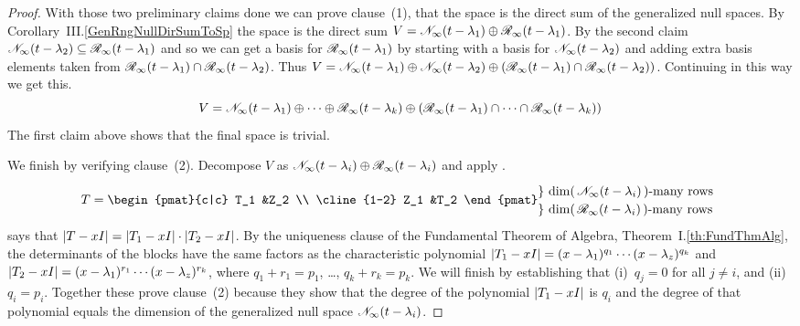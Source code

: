 \begin{proof}
With those two preliminary claims done 
we can prove clause~(1), that the space is the direct sum of the
generalized null spaces.
By Corollary~III.\ref{GenRngNullDirSumToSp} the space is the direct sum
\( V=\mathscr{N}_\infty(t-\lambda_1)\oplus\mathscr{R}_\infty(t-\lambda_1) \).
By the second claim
\( \mathscr{N}_\infty(t-\lambda_2)\subseteq\mathscr{R}_\infty(t-\lambda_1) \)
and so we can get a basis for \( \mathscr{R}_\infty(t-\lambda_1) \) by
starting with a basis for \( \mathscr{N}_\infty(t-\lambda_2) \) and adding
extra basis elements taken from
\( \mathscr{R}_\infty(t-\lambda_1)\cap\mathscr{R}_\infty(t-\lambda_2) \). 
Thus \( V=\mathscr{N}_\infty(t-\lambda_1)\oplus\mathscr{N}_\infty(t-\lambda_2)
          \oplus 
       (\mathscr{R}_\infty(t-\lambda_1)\cap\mathscr{R}_\infty(t-\lambda_2)) \).
Continuing in this way we get this.
\begin{equation*}
  V=\mathscr{N}_\infty(t-\lambda_1)\oplus\cdots\oplus\mathscr{R}_\infty(t-\lambda_k)
          \oplus 
       (\mathscr{R}_\infty(t-\lambda_1)\cap\cdots\cap\mathscr{R}_\infty(t-\lambda_k))
\end{equation*}
The first claim above shows that the final space is trivial. 

We finish by verifying clause~(2).
Decompose \( V \) as 
\( \mathscr{N}_\infty(t-\lambda_i)\oplus\mathscr{R}_\infty(t-\lambda_i) \)
and apply .
\begin{equation*}   \renewcommand{\arraystretch}{1.2}
  T=
  \begin{pmat}{c|c}
      T_1   &Z_2  \\  \cline{1-2}
      Z_1   &T_2
   \end{pmat}
   \begin{array}{@{}l}
     \} \text{\ $\dim(\,\gennullspace{t-\lambda_i}\,)$-many rows}  \\
     \} \text{\ $\dim(\,\genrangespace{t-\lambda_i}\,)$-many rows}
   \end{array}
\end{equation*}
 says that
\( \deter{T-xI}=\deter{T_1-xI}\cdot\deter{T_2-xI} \).
By the uniqueness clause of the Fundamental Theorem of Algebra, 
Theorem~I.\ref{th:FundThmAlg},
the determinants of the blocks have the same factors as the
characteristic polynomial
\( \deter{T_1-xI}=(x-\lambda_1)^{q_1}\cdots(x-\lambda_z)^{q_k} \)
and
\( \deter{T_2-xI}=(x-\lambda_1)^{r_1}\cdots(x-\lambda_z)^{r_k} \),
where
\( q_1+r_1=p_1 \), \dots, \( q_k+r_k=p_k \).
We will finish by establishing that (i)~$q_j=0$ for all $j\neq i$,
and (ii)~$q_i=p_i$.
Together these prove clause~(2) because they show that the degree of 
the polynomial $\deter{T_1-xI}$ is $q_i$ and
the degree of that polynomial equals 
the dimension of the
generalized null space $\mathscr{N}_\infty(t-\lambda_i)$. 


\end{proof}
